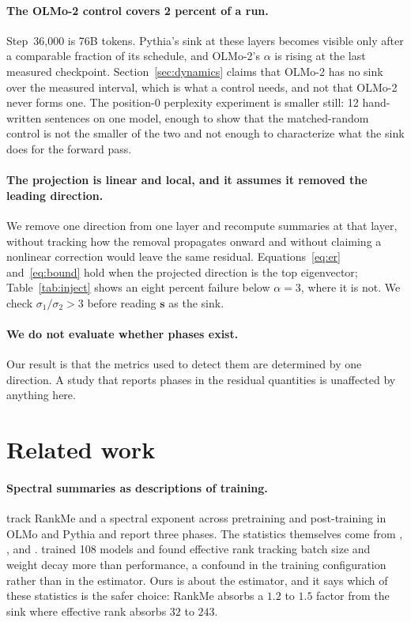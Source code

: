 \documentclass{article}
\theoremstyle{spaced}
\theoremstyle{definition}
\newcommand{\bs}{\mathbf{s}}
\begin{document}
\paragraph{The OLMo-2 control covers 2 percent of a run.} Step~36{,}000 is 76B tokens. Pythia's sink at these layers becomes visible only after a comparable fraction of its schedule, and OLMo-2's $\alpha$ is rising at the last measured checkpoint. Section~\ref{sec:dynamics} claims that OLMo-2 has no sink over the measured interval, which is what a control needs, and not that OLMo-2 never forms one. The position-0 perplexity experiment is smaller still: 12 hand-written sentences on one model, enough to show that the matched-random control is not the smaller of the two and not enough to characterize what the sink does for the forward pass.

\paragraph{The projection is linear and local, and it assumes it removed the leading direction.} We remove one direction from one layer and recompute summaries at that layer, without tracking how the removal propagates onward and without claiming a nonlinear correction would leave the same residual. Equations~\ref{eq:er} and~\ref{eq:bound} hold when the projected direction is the top eigenvector; Table~\ref{tab:inject} shows an eight percent failure below $\alpha = 3$, where it is not. We check $\sigma_1/\sigma_2 > 3$ before reading $\bs$ as the sink.

\paragraph{We do not evaluate whether phases exist.} Our result is that the metrics used to detect them are determined by one direction. A study that reports phases in the residual quantities is unaffected by anything here.

\section{Related work}
\label{sec:related}

\paragraph{Spectral summaries as descriptions of training.} \citet{li2025tracing} track RankMe and a spectral exponent across pretraining and post-training in OLMo and Pythia and report three phases. The statistics themselves come from \citet{roy2007effective}, \citet{garrido2023rankme}, \citet{ethayarajh2019contextual} and \citet{raghu2021vision}. \citet{kulkarni2026disentangling} trained 108 models and found effective rank tracking batch size and weight decay more than performance, a confound in the training configuration rather than in the estimator. Ours is about the estimator, and it says which of these statistics is the safer choice: RankMe absorbs a $1.2$ to $1.5$ factor from the sink where effective rank absorbs $32$ to $243$.
\end{document}
